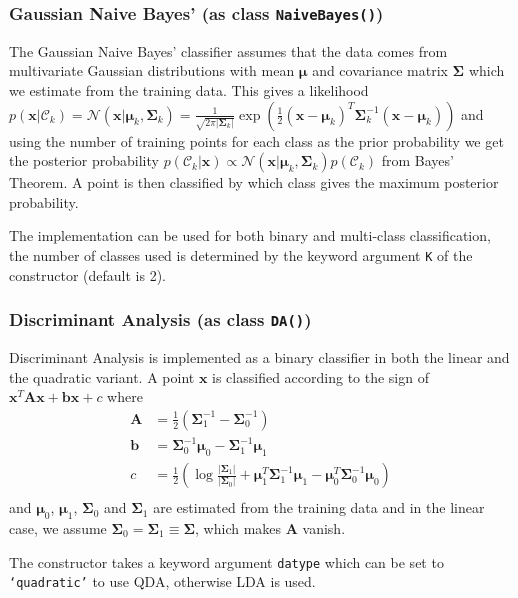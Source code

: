 \documentclass[a4paper, 12pt]{article}
\begin{document}
\subsubsection{Gaussian Naive Bayes' (as class \texttt{NaiveBayes()})}
The Gaussian Naive Bayes' classifier assumes that the data comes from multivariate Gaussian distributions with mean $\bm{\mu}$ and covariance matrix $\bm{\Sigma}$ which we estimate from the training data. This gives a likelihood $p(\mathbf{x} | \mathcal{C}_k) = \mathcal{N}(\mathbf{x} | \bm{\mu}_k, \bm{\Sigma}_k) = \frac{1}{\sqrt{2 \pi |\bm{\Sigma}_k|}} \exp\left(\frac{1}{2} (\mathbf{x} - \bm{\mu}_k)^T\bm{\Sigma}_k^{-1}(\mathbf{x} - \bm{\mu}_k)\right)$ and using the number of training points for each class as the prior probability we get the posterior probability $p(\mathcal{C}_k | \mathbf{x}) \propto \mathcal{N}(\mathbf{x} | \bm{\mu}_k, \bm{\Sigma}_k) p(\mathcal{C}_k)$ from Bayes' Theorem. A point is then classified by which class gives the maximum posterior probability.

The implementation can be used for both binary and multi-class classification, the number of classes used is determined by the keyword argument \texttt{K} of the constructor (default is 2).
    
\subsubsection{Discriminant Analysis (as class \texttt{DA()})}
Discriminant Analysis is implemented as a binary classifier in both the linear and the quadratic variant. A point $\mathbf{x}$ is classified according to the sign of $\mathbf{x}^T\mathbf{Ax} + \mathbf{bx} + c$ where
\begin{align*}
\mathbf{A} &= \frac{1}{2} \left(\bm{\Sigma}_1^{-1} - \bm{\Sigma}_0^{-1}\right) \\
\mathbf{b} &= \bm{\Sigma}_0^{-1}\bm{\mu}_0 - \bm{\Sigma}_1^{-1}\bm{\mu}_1 \\
c &= \frac{1}{2} \left( \log\frac{|\bm{\Sigma}_1|}{|\bm{\Sigma}_0|} + \bm{\mu}_1^T\bm{\Sigma}_1^{-1}\bm{\mu}_1 - \bm{\mu}_0^T\bm{\Sigma}_0^{-1}\bm{\mu}_0 \right) \\
\end{align*}
and $\bm{\mu}_0$, $\bm{\mu}_1$, $\bm{\Sigma}_0$ and $\bm{\Sigma}_1$ are estimated from the training data and in the linear case, we assume $\bm{\Sigma}_0 = \bm{\Sigma}_1 \equiv \bm{\Sigma}$, which makes $\mathbf{A}$ vanish.

The constructor takes a keyword argument \texttt{datype} which can be set to \texttt{`quadratic'} to use QDA, otherwise LDA is used.
\end{document}
